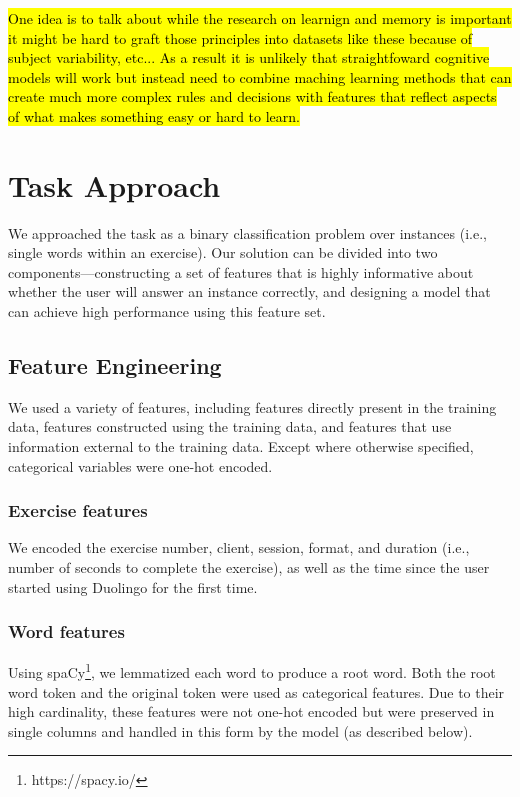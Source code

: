 \documentclass[11pt,a4paper]{article}
\begin{document}
\hl{One idea is to talk about while the research on learnign and memory is important
it might be hard to graft those principles into datasets like these because of 
subject variability, etc... As a result it is unlikely that straightfoward
cognitive models will work but instead need to combine maching learning methods
that can create much more complex rules and decisions with features that reflect
aspects of what makes something easy or hard to learn.}


\cite{Tubridy:2018aa}
\cite{Tubridy:2018ab}
\cite{Corbett1995bkt}
\cite{Roediger2006te,Anderson1994rif,Mozer:2009cs}
\section{Task Approach}

We approached the task as a binary classification problem over instances (i.e.,
single words within an exercise). Our solution can be divided into two
components---constructing a set of features that is highly informative about
whether the user will answer an instance correctly, and designing a model that
can achieve high performance using this feature set.

\subsection{Feature Engineering}

We used a variety of features, including features directly present in the
training data, features constructed using the training data, and features that
use information external to the training data. Except where otherwise specified,
categorical variables were one-hot encoded.

\subsubsection{Exercise features}

We encoded the exercise number, client, session, format, and duration (i.e., number of
seconds to complete the exercise), as well as the time since the user started using Duolingo for the first time.

\subsubsection{Word features}

Using spaCy\footnote{https://spacy.io/}, we lemmatized each word to produce a root word. Both the root
word token and the original token were used as categorical features. Due to
their high cardinality, these features were not one-hot encoded but were
preserved in single columns and handled in this form by the model (as described
below).
\end{document}
